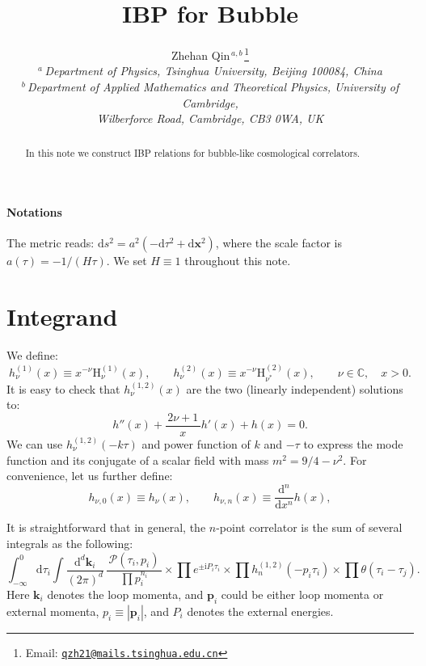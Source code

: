 \documentclass[a4paper,12pt]{article}
\newcommand{\FR}[2]{\displaystyle\frac{\,{#1}\,}{#2}}
\def\bge{\begin{equation}}
\def\ede{\end{equation}}
\def\di{{\mathrm{d}}}
\def\mb{\mathbf}
\def\ii{\mathrm{i}}
\newcommand{\fnemail}[1]{\footnote{Email: \href{mailto:#1}{\nolinkurl{#1}}}}
\begin{document}
\title{\Large\textbf{IBP for Bubble\\[2mm]}}

\author{Zhehan Qin$^{\,a,b\,}$\fnemail{qzh21@mails.tsinghua.edu.cn}\\[5mm]
$^a\,$\normalsize{\emph{Department of Physics, Tsinghua University, Beijing 100084, China} }\\
$^b\,$\normalsize{\emph{Department of Applied Mathematics and Theoretical Physics, University of Cambridge,}}\\\normalsize{\emph{Wilberforce Road, Cambridge, CB3 0WA, UK}}\\
}

\date{}
\maketitle

\vspace{20mm}

\begin{abstract}
In this note we construct IBP relations for bubble-like cosmological correlators.
\vspace{10mm}
\end{abstract}

\newpage
\tableofcontents


\paragraph{Notations} The metric reads: $\di s^2=a^2(-\di\tau^2+\di \mb x^2)$, where the scale factor is $a(\tau) = -1/(H\tau)$. We set $H\equiv 1$ throughout this note.

\section{Integrand}
We define:
\bge
h_\nu^{(1)}(x) \equiv x^{-\nu}\mathrm H_{\nu}^{(1)}(x),\qquad h_\nu^{(2)}(x) \equiv x^{-\nu}\mathrm H_{\nu^*}^{(2)}(x),\qquad \nu\in\mathbb C,\quad x>0.
\ede
It is easy to check that $h_\nu^{(1,2)}(x)$ are the two (linearly independent) solutions to:
\bge
\label{eq_hdef}
h''(x) + \FR{2\nu+1}{x}h'(x) + h(x) = 0.
\ede
We can use $h^{(1,2)}_\nu(-k\tau)$ and power function of $k$ and $-\tau$ to express the mode function and its conjugate of a scalar field with mass $m^2=9/4-\nu^2$. For convenience, let us further define:
\bge
h_{\nu,0}(x)\equiv h_\nu(x),\qquad h_{\nu,n} (x)  \equiv  \FR{\di^n}{\di x^n}h(x),
\ede

 It is straightforward that in general, the $n$-point correlator is the sum of several integrals as the following:
\bge
\int_{-\infty}^0 \di\tau_i \int \FR{\di^d \mb k_i}{(2\pi)^d}\, \FR{\mathcal P(\tau_i,p_i)}{\prod p_i^{n_i}} \times \prod e^{\pm \ii P_i \tau_i} \times \prod h_n^{(1,2)}(-p_i\tau_i) \times \prod \theta(\tau_i-\tau_j).
\ede
Here $\bm k_i$ denotes the loop momenta, and $\bm p_i$ could be either loop momenta or external momenta, $p_i \equiv |\mb p_i|$, and $P_i$ denotes the external energies.
\end{document}
